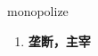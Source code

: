
\begin{frame}
{\huge monopolize}
\begin{center}
\begin{enumerate}\Large
  \item \textbf{垄断，主宰}
\end{enumerate}
\end{center}
\end{frame}
